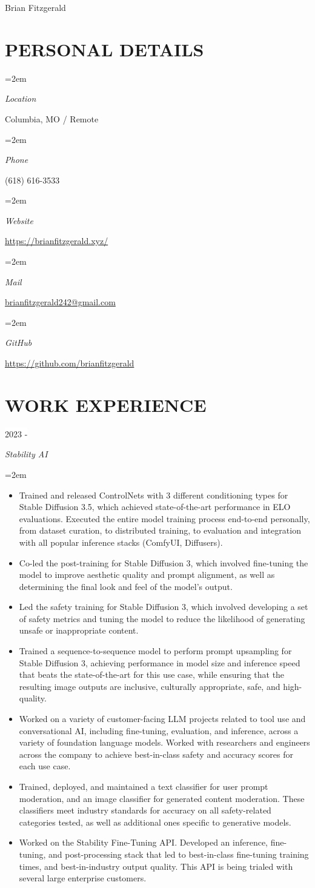 \documentclass[paper=a4,fontsize=9pt]{scrartcl} %
\newlength{\spacebox}
\newcommand{\sepspace}{\vspace*{0.8em}}		%
\newcommand{\MyName}[1]{ %
			\Huge \usefont{OT1}{phv}{b}{n} \hfill #1
			\par \normalsize \normalfont}
\newcommand{\NewPart}[1]{\section*{\uppercase{#1}}}
\newcommand{\PersonalEntry}[2]{
			\noindent\hangindent=2em\hangafter=0 %
			\parbox{\spacebox}{        %
			\textit{#1}}		       %
			\hspace{1.5em} #2 \par}    %
\newcommand{\EducationEntry}[4]{
			\noindent {#1} \hfill      %
			\colorbox{Black}{%
				\parbox{6em}{%
				\hfill\color{White}#2}} \par  %
			\noindent \textit{#3} \par        %
			\noindent\hangindent=2em\hangafter=0 \small #4 %
			\normalsize \par}
\newcommand{\WorkEntry}[4]{				  %
			\noindent {#1} \hfill      %
			\colorbox{White}{\color{Black}#2} \par  %
			\noindent \textit{#3} \par              %
			\noindent\hangindent=2em\hangafter=0 \small #4 %
			\normalsize \par}
\begin{document}
	\MyName{Brian Fitzgerald}

	\sepspace

	\NewPart{Personal details}{}

	\PersonalEntry{Location}{Columbia, MO / Remote}
	\PersonalEntry{Phone}{(618) 616-3533}
	\PersonalEntry{Website}{\url{https://brianfitzgerald.xyz/}}
	\PersonalEntry{Mail}{\url{brianfitzgerald242@gmail.com}}
	\PersonalEntry{GitHub}{\url{https://github.com/brianfitzgerald}}

	\NewPart{Work experience}{}

	\WorkEntry{ML Research Engineer}{2023 - }{Stability AI}{
		\begin{itemize}
			\item Trained and released ControlNets with 3 different conditioning types for Stable Diffusion 3.5, which achieved state-of-the-art performance in ELO evaluations. Executed the entire model training process end-to-end personally, from dataset curation, to distributed training, to evaluation and integration with all popular inference stacks (ComfyUI, Diffusers).
			\item Co-led the post-training for Stable Diffusion 3, which involved fine-tuning the model to improve aesthetic quality and prompt alignment, as well as determining the final look and feel of the model's output.
			\item Led the safety training for Stable Diffusion 3, which involved developing a set of safety metrics and tuning the model to reduce the likelihood of generating unsafe or inappropriate content.
			\item Trained a sequence-to-sequence model to perform prompt upsampling for Stable Diffusion 3, achieving performance in model size and inference speed that beats the state-of-the-art for this use case, while ensuring that the resulting image outputs are inclusive, culturally appropriate, safe, and high-quality.
			\item Worked on a variety of customer-facing LLM projects related to tool use and conversational AI, including fine-tuning, evaluation, and inference, across a variety of foundation language models. Worked with researchers and engineers across the company to achieve best-in-class safety and accuracy scores for each use case.
			\item Trained, deployed, and maintained a text classifier for user prompt moderation, and an image classifier for generated content moderation. These classifiers meet industry standards for accuracy on all safety-related categories tested, as well as additional ones specific to generative models.
			\item Worked on the Stability Fine-Tuning API. Developed an inference, fine-tuning, and post-processing stack that led to best-in-class fine-tuning training times, and best-in-industry output quality. This API is being trialed with several large enterprise customers.
		\end{itemize}
	}
	\sepspace
\end{document}
